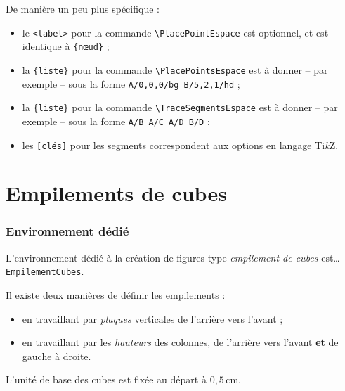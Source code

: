 \documentclass[french,a4paper,11pt]{article}
\providecommand\tikzlogo{Ti\textit{k}Z}
\let\TikZ\tikzlogo
\begin{document}
\begin{tipblock}
De manière un peu plus spécifique :

\begin{itemize}
	\item le \texttt{<label>} pour la commande \texttt{\textbackslash PlacePointEspace} est optionnel, et est identique à \texttt{\{nœud\}} ;
	\item la \texttt{\{liste\}} pour la commande \texttt{\textbackslash PlacePointsEspace} est à donner -- par exemple -- sous la forme \texttt{A/0,0,0/bg B/5,2,1/hd} ;
	\item la \texttt{\{liste\}} pour la commande \texttt{\textbackslash TraceSegmentsEspace} est à donner -- par exemple -- sous la forme \texttt{A/B A/C A/D B/D} ;
	\item les \texttt{[clés]} pour les segments correspondent aux options en langage \TikZ.
\end{itemize}
\vspace*{-\baselineskip}\leavevmode
\end{tipblock}

\begin{PresCode}{}
\begin{EnvTikzEspace}[VueClassique]
\end{EnvTikzEspace}
\end{PresCode}

\pagebreak

\part{Empilements de cubes}

\section{Environnement dédié}

\begin{cautionblock}
L'environnement dédié à la création de figures type \textit{empilement de cubes} est\ldots{} \texttt{EmpilementCubes}.

Il existe deux manières de définir les empilements :

\begin{itemize}
	\item en travaillant par \textit{plaques} verticales de l'arrière vers l'avant ;
	\item en travaillant par les \textit{hauteurs} des colonnes, de l'arrière vers l'avant \textbf{et} de gauche à droite.
\end{itemize}

L'unité de base des cubes est fixée au départ à $0{,}5$\,cm.
\end{cautionblock}
\end{document}
